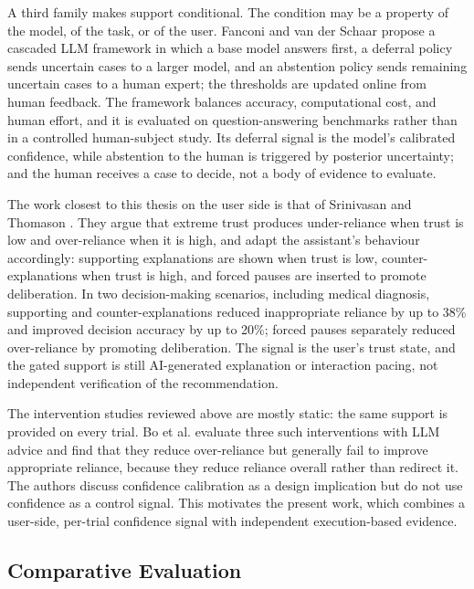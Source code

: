 \documentclass[oneside,final,14pt,a4paper]{extreport}
\begin{document}
A third family makes support conditional. The condition may be a property of
the model, of the task, or of the user. Fanconi and van der Schaar
\cite{CascadedLM2025} propose a cascaded LLM framework in which a base model
answers first, a deferral policy sends uncertain cases to a larger model, and an
abstention policy sends remaining uncertain cases to a human expert; the
thresholds are updated online from human feedback. The framework balances
accuracy, computational cost, and human effort, and it is evaluated on
question-answering benchmarks rather than in a controlled human-subject study.
Its deferral signal is the model's calibrated confidence, while abstention to
the human is triggered by posterior uncertainty; and the human receives a case
to decide, not a body of evidence to evaluate.

The work closest to this thesis on the user side is that of Srinivasan and
Thomason \cite{SrinivasanAdjustForTrust}. They argue that extreme trust produces
under-reliance when trust is low and over-reliance when it is high, and adapt
the assistant's behaviour accordingly: supporting explanations are shown when
trust is low, counter-explanations when trust is high, and forced pauses are
inserted to promote deliberation. In two decision-making scenarios, including
medical diagnosis, supporting and counter-explanations reduced inappropriate
reliance by up to 38\% and improved decision accuracy by up to 20\%; forced
pauses separately reduced over-reliance by promoting deliberation. The signal
is the user's trust state, and the gated support is still AI-generated
explanation or interaction pacing, not independent verification of the
recommendation.

The intervention studies reviewed above are mostly static: the same support is
provided on every trial. Bo et al. \cite{Bo2025} evaluate three such
interventions with LLM advice and find that they reduce over-reliance but
generally fail to improve appropriate reliance, because they reduce reliance
overall rather than redirect it. The authors discuss confidence calibration as
a design implication but do not use confidence as a control signal. This
motivates the present work, which combines a user-side, per-trial confidence
signal with independent execution-based evidence.

\subsection{Comparative Evaluation}
\label{sec:lit-comparison}
\end{document}
